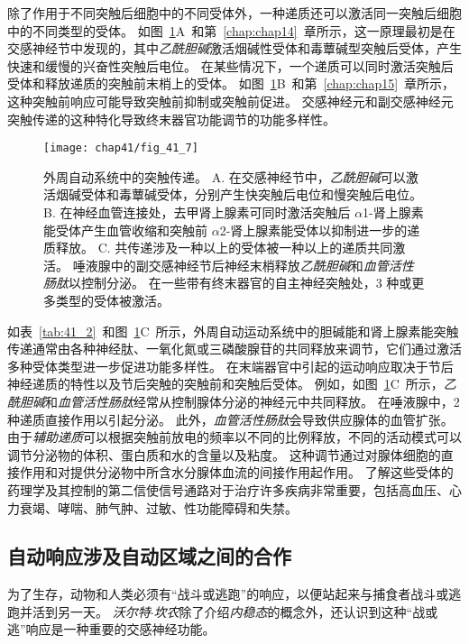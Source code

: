除了作用于不同突触后细胞中的不同受体外，一种递质还可以激活同一突触后细胞中的不同类型的受体。
如图~\ref{fig:41_7}A~和第~\ref{chap:chap14}~章所示，这一原理最初是在交感神经节中发现的，其中\textit{乙酰胆碱}激活烟碱性受体和毒蕈碱型突触后受体，产生快速和缓慢的兴奋性突触后电位。
在某些情况下，一个递质可以同时激活突触后受体和释放递质的突触前末梢上的受体。
如图~\ref{fig:41_7}B~和第~\ref{chap:chap15}~章所示，这种突触前响应可能导致突触前抑制或突触前促进。
交感神经元和副交感神经元突触传递的这种特化导致终末器官功能调节的功能多样性。


\begin{figure}[htbp]
	\centering
	\texttt{[image: chap41/fig\_41\_7]}
	\caption{外周自动系统中的突触传递。
		A. 在交感神经节中，\textit{乙酰胆碱}可以激活烟碱受体和毒蕈碱受体，分别产生快突触后电位和慢突触后电位。
		B. 在神经血管连接处，去甲肾上腺素可同时激活突触后 $\alpha$1-肾上腺素能受体产生血管收缩和突触前 $\alpha$2-肾上腺素能受体以抑制进一步的递质释放。
		C. 共传递涉及一种以上的受体被一种以上的递质共同激活。
		唾液腺中的副交感神经节后神经末梢释放\textit{乙酰胆碱}和\textit{血管活性肠肽}以控制分泌。
		在一些带有终末器官的自主神经突触处，3 种或更多类型的受体被激活。}
	\label{fig:41_7}
\end{figure}


如表~\ref{tab:41_2}~和图~\ref{fig:41_7}C~所示，外周自动运动系统中的胆碱能和肾上腺素能突触传递通常由各种神经肽、一氧化氮或三磷酸腺苷的共同释放来调节，它们通过激活多种受体类型进一步促进功能多样性。
在末端器官中引起的运动响应取决于节后神经递质的特性以及节后突触的突触前和突触后受体。
例如，如图~\ref{fig:41_7}C~所示，\textit{乙酰胆碱}和\textit{血管活性肠肽}经常从控制腺体分泌的神经元中共同释放。
在唾液腺中，2 种递质直接作用以引起分泌。
此外，\textit{血管活性肠肽}会导致供应腺体的血管扩张。
由于\textit{辅助递质}可以根据突触前放电的频率以不同的比例释放，不同的活动模式可以调节分泌物的体积、蛋白质和水的含量以及粘度。
这种调节通过对腺体细胞的直接作用和对提供分泌物中所含水分腺体血流的间接作用起作用。
了解这些受体的药理学及其控制的第二信使信号通路对于治疗许多疾病非常重要，包括高血压、心力衰竭、哮喘、肺气肿、过敏、性功能障碍和失禁。



\subsection{自动响应涉及自动区域之间的合作}

为了生存，动物和人类必须有“战斗或逃跑”的响应，以便站起来与捕食者战斗或逃跑并活到另一天。
\textit{沃尔特$\cdot$坎农}除了介绍\textit{内稳态}的概念外，还认识到这种“战或逃”响应是一种重要的交感神经功能。


